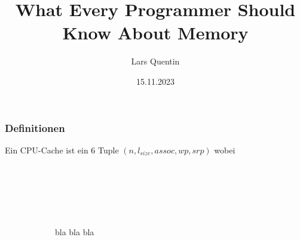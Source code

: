 \documentclass{beamer}
\title{What Every Programmer Should Know About Memory}
\author{Lars Quentin}
\date{15.11.2023}
\begin{document}
\frame{\titlepage}


\begin{frame}[t]
\frametitle{Definitionen}
Ein CPU-Cache ist ein 6 Tuple $(n, l_{size}, assoc, wp, srp)$ wobei
~\\~\\~\\~\\~\\~\\~\\\pause
{\Huge
~~~~~~~~~~~~bla bla bla
}
\end{frame}
\end{document}
